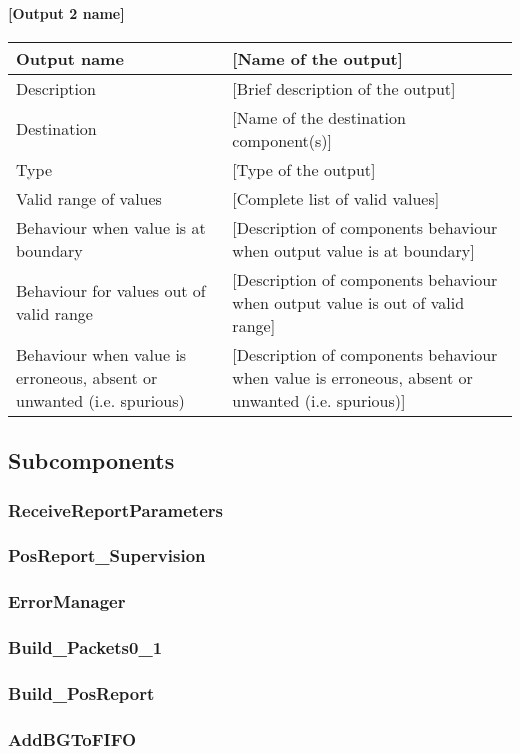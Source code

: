 \paragraph{[Output 2 name]}

\begin{longtable}{p{}p{}}
\toprule
Output name				& [Name of the output] \\
\midrule
Description				& [Brief description of the output] \\
\midrule
Destination				& [Name of the destination component(s)] \\ 
\midrule
Type					& [Type of the output] \\
\midrule
Valid range of values	& [Complete list of valid values] \\
\midrule
Behaviour when value is at boundary	& [Description of components behaviour when output value is at boundary] \\
\midrule
Behaviour for values out of valid range	& [Description of components behaviour when output value is out of valid range] \\
\midrule
Behaviour when value is erroneous, absent or unwanted (i.e. spurious) & [Description of components behaviour when value is erroneous, absent or unwanted (i.e. spurious)] \\
\bottomrule
\end{longtable}


\subsection{Subcomponents}\label{s:provide_position_report_subcomponents}

\subsubsection{ReceiveReportParameters}


\subsubsection{PosReport\_Supervision}


\subsubsection{ErrorManager}


\subsubsection{Build\_Packets0\_1}


\subsubsection{Build\_PosReport}


\subsubsection{AddBGToFIFO}


